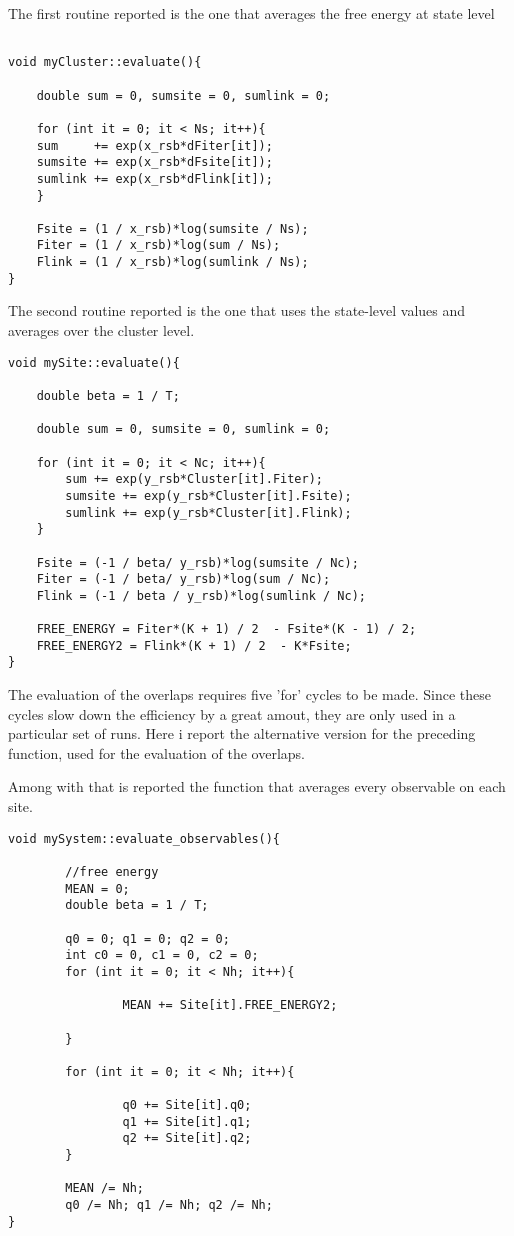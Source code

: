 The first routine reported is the one that averages the free energy at state level

\begin{verbatim}

void myCluster::evaluate(){
	
	double sum = 0, sumsite = 0, sumlink = 0;

	for (int it = 0; it < Ns; it++){
	sum     += exp(x_rsb*dFiter[it]);
	sumsite += exp(x_rsb*dFsite[it]);
	sumlink += exp(x_rsb*dFlink[it]);
	}

	Fsite = (1 / x_rsb)*log(sumsite / Ns);
	Fiter = (1 / x_rsb)*log(sum / Ns);
	Flink = (1 / x_rsb)*log(sumlink / Ns);
}
\end{verbatim}

The second routine reported is the one that uses the state-level values and averages over the cluster level.

\begin{verbatim}
void mySite::evaluate(){

	double beta = 1 / T;

	double sum = 0, sumsite = 0, sumlink = 0;

	for (int it = 0; it < Nc; it++){
		sum += exp(y_rsb*Cluster[it].Fiter);
		sumsite += exp(y_rsb*Cluster[it].Fsite);
		sumlink += exp(y_rsb*Cluster[it].Flink);
	}

	Fsite = (-1 / beta/ y_rsb)*log(sumsite / Nc);
	Fiter = (-1 / beta/ y_rsb)*log(sum / Nc);
	Flink = (-1 / beta / y_rsb)*log(sumlink / Nc);

	FREE_ENERGY = Fiter*(K + 1) / 2  - Fsite*(K - 1) / 2;
	FREE_ENERGY2 = Flink*(K + 1) / 2  - K*Fsite;
}

\end{verbatim}

The evaluation of the overlaps requires five 'for' cycles to be made. Since these cycles slow down the efficiency by a great amout, 
they are only used in a particular set of runs. Here i report the alternative version for the preceding function, used for the evaluation of the overlaps.


Among with that is reported the function that averages every observable on each site.

\begin{verbatim}
void mySystem::evaluate_observables(){

        //free energy
        MEAN = 0;
        double beta = 1 / T;
        
        q0 = 0; q1 = 0; q2 = 0;
        int c0 = 0, c1 = 0, c2 = 0;
        for (int it = 0; it < Nh; it++){

                MEAN += Site[it].FREE_ENERGY2;

        }
        
        for (int it = 0; it < Nh; it++){

                q0 += Site[it].q0;
                q1 += Site[it].q1;
                q2 += Site[it].q2;
        }
        
        MEAN /= Nh;
        q0 /= Nh; q1 /= Nh; q2 /= Nh;
}
\end{verbatim}
